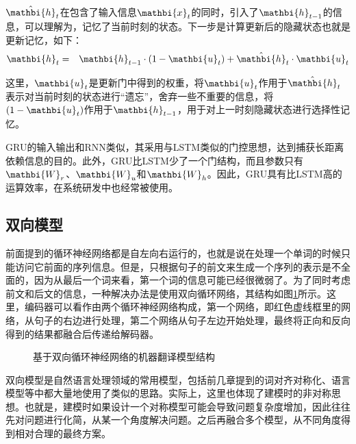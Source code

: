 \parinterval $\hat{\mathbi{h}}_t$在包含了输入信息$\mathbi{x}_t$的同时，引入了$\mathbi{h}_{t-1}$的信息，可以理解为，记忆了当前时刻的状态。下一步是计算更新后的隐藏状态也就是更新记忆，如下：
\begin{eqnarray}
\mathbi{h}_t &=& \mathbi{h}_{t-1} \cdot (1-\mathbi{u}_t)  + \hat{\mathbi{h}}_t \cdot \mathbi{u}_t 
\label{eq:10-15}
\end{eqnarray}

\noindent 这里，$\mathbi{u}_t$是更新门中得到的权重，将$\mathbi{u}_t$作用于$\hat{\mathbi{h}}_t$表示对当前时刻的状态进行“遗忘”，舍弃一些不重要的信息，将$(1-\mathbi{u}_t)$作用于$\mathbi{h}_{t-1}$，用于对上一时刻隐藏状态进行选择性记忆。

\parinterval GRU的输入输出和RNN类似，其采用与LSTM类似的门控思想，达到捕获长距离依赖信息的目的。此外，GRU比LSTM少了一个门结构，而且参数只有$\mathbi{W}_r$、$\mathbi{W}_u$和$\mathbi{W}_h$。因此，GRU具有比LSTM高的运算效率，在系统研发中也经常被使用。


\subsection{双向模型}

\parinterval 前面提到的循环神经网络都是自左向右运行的，也就是说在处理一个单词的时候只能访问它前面的序列信息。但是，只根据句子的前文来生成一个序列的表示是不全面的，因为从最后一个词来看，第一个词的信息可能已经很微弱了。为了同时考虑前文和后文的信息，一种解决办法是使用双向循环网络，其结构如图\ref{fig:10-14}所示。这里，编码器可以看作由两个循环神经网络构成，第一个网络，即红色虚线框里的网络，从句子的右边进行处理，第二个网络从句子左边开始处理，最终将正向和反向得到的结果都融合后传递给解码器。

\begin{figure}[htp]
\centering

\caption{基于双向循环神经网络的机器翻译模型结构}
\label{fig:10-14}
\end{figure}

\parinterval 双向模型是自然语言处理领域的常用模型，包括前几章提到的词对齐对称化、语言模型等中都大量地使用了类似的思路。实际上，这里也体现了建模时的非对称思想。也就是，建模时如果设计一个对称模型可能会导致问题复杂度增加，因此往往先对问题进行化简，从某一个角度解决问题。之后再融合多个模型，从不同角度得到相对合理的最终方案。

